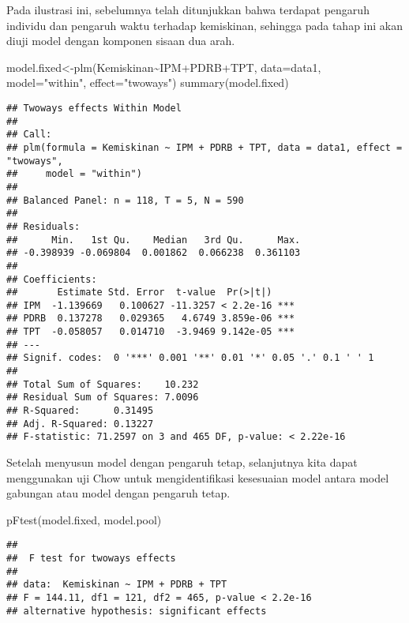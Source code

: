 \documentclass[
]{book}
\newenvironment{Shaded}{\begin{snugshade}}{\end{snugshade}}
\newcommand{\AttributeTok}[1]{\textcolor[rgb]{0.77,0.63,0.00}{#1}}
\newcommand{\FunctionTok}[1]{\textcolor[rgb]{0.00,0.00,0.00}{#1}}
\newcommand{\NormalTok}[1]{#1}
\newcommand{\OtherTok}[1]{\textcolor[rgb]{0.56,0.35,0.01}{#1}}
\newcommand{\SpecialCharTok}[1]{\textcolor[rgb]{0.00,0.00,0.00}{#1}}
\newcommand{\StringTok}[1]{\textcolor[rgb]{0.31,0.60,0.02}{#1}}
\begin{document}
Pada ilustrasi ini, sebelumnya telah ditunjukkan bahwa terdapat pengaruh individu dan pengaruh waktu terhadap kemiskinan, sehingga pada tahap ini akan diuji model dengan komponen sisaan dua arah.

\begin{Shaded}
\begin{Highlighting}[]
\NormalTok{model.fixed}\OtherTok{\textless{}{-}}\FunctionTok{plm}\NormalTok{(Kemiskinan}\SpecialCharTok{\textasciitilde{}}\NormalTok{IPM}\SpecialCharTok{+}\NormalTok{PDRB}\SpecialCharTok{+}\NormalTok{TPT, }\AttributeTok{data=}\NormalTok{data1, }\AttributeTok{model=}\StringTok{"within"}\NormalTok{, }\AttributeTok{effect=}\StringTok{"twoways"}\NormalTok{)}
\FunctionTok{summary}\NormalTok{(model.fixed)}
\end{Highlighting}
\end{Shaded}

\begin{verbatim}
## Twoways effects Within Model
## 
## Call:
## plm(formula = Kemiskinan ~ IPM + PDRB + TPT, data = data1, effect = "twoways", 
##     model = "within")
## 
## Balanced Panel: n = 118, T = 5, N = 590
## 
## Residuals:
##      Min.   1st Qu.    Median   3rd Qu.      Max. 
## -0.398939 -0.069804  0.001862  0.066238  0.361103 
## 
## Coefficients:
##       Estimate Std. Error  t-value  Pr(>|t|)    
## IPM  -1.139669   0.100627 -11.3257 < 2.2e-16 ***
## PDRB  0.137278   0.029365   4.6749 3.859e-06 ***
## TPT  -0.058057   0.014710  -3.9469 9.142e-05 ***
## ---
## Signif. codes:  0 '***' 0.001 '**' 0.01 '*' 0.05 '.' 0.1 ' ' 1
## 
## Total Sum of Squares:    10.232
## Residual Sum of Squares: 7.0096
## R-Squared:      0.31495
## Adj. R-Squared: 0.13227
## F-statistic: 71.2597 on 3 and 465 DF, p-value: < 2.22e-16
\end{verbatim}

Setelah menyusun model dengan pengaruh tetap, selanjutnya kita dapat menggunakan uji Chow untuk mengidentifikasi kesesuaian model antara model gabungan atau model dengan pengaruh tetap.

\begin{Shaded}
\begin{Highlighting}[]
\FunctionTok{pFtest}\NormalTok{(model.fixed, model.pool)}
\end{Highlighting}
\end{Shaded}

\begin{verbatim}
## 
##  F test for twoways effects
## 
## data:  Kemiskinan ~ IPM + PDRB + TPT
## F = 144.11, df1 = 121, df2 = 465, p-value < 2.2e-16
## alternative hypothesis: significant effects
\end{verbatim}
\end{document}
